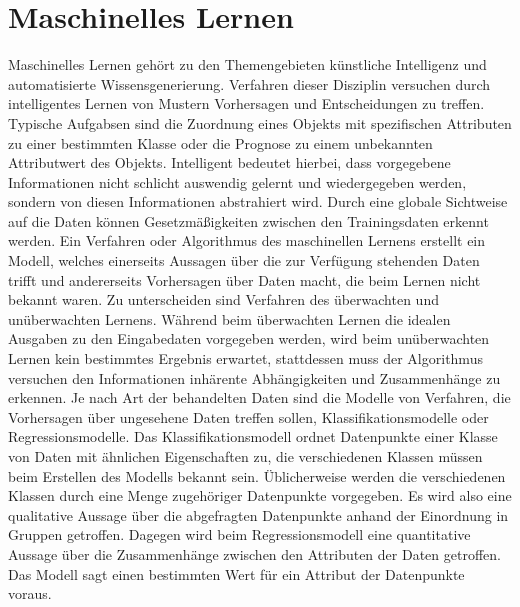 \documentclass[
	12pt,
	a4paper,
	BCOR10mm,
	DIV14,
	listof=totoc,
	bibliography=totoc,
	headsepline
]{scrreprt}
\begin{document}
\section{Maschinelles Lernen}
\label{ML}
Maschinelles Lernen gehört zu den Themengebieten künstliche Intelligenz und automatisierte Wissensgenerierung. Verfahren dieser Disziplin versuchen durch intelligentes Lernen von Mustern Vorhersagen und Entscheidungen zu treffen.
Typische Aufgabsen sind die Zuordnung eines Objekts mit spezifischen Attributen zu einer bestimmten Klasse oder die Prognose zu einem unbekannten Attributwert des Objekts. 
Intelligent bedeutet hierbei, dass vorgegebene Informationen nicht schlicht auswendig gelernt und wiedergegeben werden, sondern von diesen Informationen abstrahiert wird. Durch eine globale Sichtweise auf die Daten können Gesetzmäßigkeiten zwischen den Trainingsdaten erkennt werden.
Ein Verfahren oder Algorithmus des maschinellen Lernens erstellt ein Modell, welches einerseits Aussagen über die zur Verfügung stehenden Daten trifft und andererseits Vorhersagen über Daten macht, die beim Lernen nicht bekannt waren. 
Zu unterscheiden sind Verfahren des überwachten und unüberwachten Lernens. Während beim überwachten Lernen die idealen Ausgaben zu den Eingabedaten vorgegeben werden, wird beim unüberwachten Lernen kein bestimmtes Ergebnis erwartet, stattdessen muss der Algorithmus versuchen den Informationen inhärente Abhängigkeiten und Zusammenhänge zu erkennen.
Je nach Art der behandelten Daten sind die Modelle von Verfahren, die Vorhersagen über ungesehene Daten treffen sollen, Klassifikationsmodelle oder Regressionsmodelle. Das Klassifikationsmodell ordnet Datenpunkte einer Klasse von Daten mit ähnlichen Eigenschaften zu, die verschiedenen Klassen müssen beim Erstellen des Modells bekannt sein. Üblicherweise werden die verschiedenen Klassen durch eine Menge zugehöriger Datenpunkte vorgegeben. Es wird also eine qualitative Aussage über die abgefragten Datenpunkte anhand der Einordnung in Gruppen getroffen.
Dagegen wird beim Regressionsmodell eine quantitative Aussage über die Zusammenhänge zwischen den Attributen der Daten getroffen. Das Modell sagt einen bestimmten Wert für ein Attribut der Datenpunkte voraus.  
\end{document}
